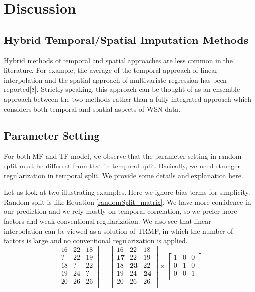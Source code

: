 \section{Discussion}  \label{sec:disc}

\subsection{Hybrid Temporal/Spatial Imputation Methods}

Hybrid methods of temporal and spatial approaches are less common in the literature.
For example, the average of the temporal approach of linear interpolation and the spatial approach of multivariate regression has been reported[8].
Strictly speaking, this approach can be thought of as an ensemble approach between the two methods rather than a fully-integrated approach which considers both temporal and spatial aspects of WSN data.

\subsection{Parameter Setting} \label{subsec:parameter}

For both MF and TF model, we observe that the parameter setting in random split must be different from that in temporal split. Basically, we need stronger regularization in temporal split.  We provide some details and explanation here. 

Let us look at two illustrating examples.
Here we ignore bias terms for simplicity.
Random split is like Equation \ref{randomSplit_matrix}.
We have more confidence in our prediction and we rely mostly on temporal correlation, so we prefer more factors and weak conventional regularization.
We also see that linear interpolation can be viewed as a solution of TRMF, in which the number of factors is large and no conventional regularization is applied. 
\begin{equation}
\label{randomSplit_matrix}
\begin{bmatrix}
16 & 22 & 18\\
 ? & 22 & 19\\
18 &  ?	& 22\\
19 & 24 &  ?\\
20 & 26 & 26\\
\end{bmatrix} 
= 
\begin{bmatrix}
16 & 22 & 18\\
\mathbf{17} & 22 & 19\\
18 & \mathbf{23}	& 22\\
19 & 24 & \mathbf{24}\\
20 & 26 & 26\\
\end{bmatrix} 
\times
\begin{bmatrix}
1 & 0 & 0\\
0 & 1 & 0\\
0 & 0 & 1\\
\end{bmatrix} 
\end{equation}

